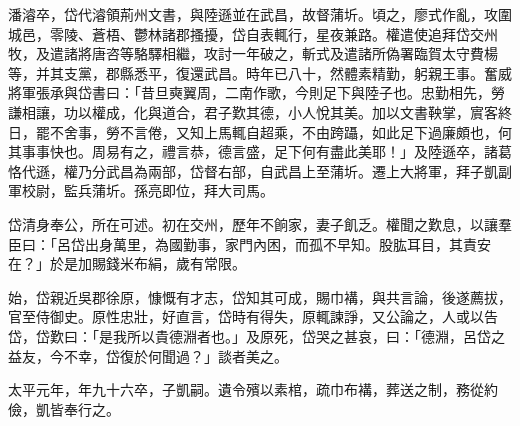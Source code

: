 \begin{pinyinscope}
潘濬卒，岱代濬領荊州文書，與陸遜並在武昌，故督蒲圻。頃之，廖式作亂，攻圍城邑，零陵、蒼梧、鬱林諸郡搔擾，岱自表輒行，星夜兼路。權遣使追拜岱交州牧，及遣諸將唐咨等駱驛相繼，攻討一年破之，斬式及遣諸所偽署臨賀太守費楊等，并其支黨，郡縣悉平，復還武昌。時年已八十，然體素精勤，躬親王事。奮威將軍張承與岱書曰：「昔旦奭翼周，二南作歌，今則足下與陸子也。忠勤相先，勞謙相讓，功以權成，化與道合，君子歎其德，小人悅其美。加以文書鞅掌，賔客終日，罷不舍事，勞不言倦，又知上馬輒自超乘，不由跨躡，如此足下過廉頗也，何其事事快也。周易有之，禮言恭，德言盛，足下何有盡此美耶！」及陸遜卒，諸葛恪代遜，權乃分武昌為兩部，岱督右部，自武昌上至蒲圻。遷上大將軍，拜子凱副軍校尉，監兵蒲圻。孫亮即位，拜大司馬。

岱清身奉公，所在可述。初在交州，歷年不餉家，妻子飢乏。權聞之歎息，以讓羣臣曰：「呂岱出身萬里，為國勤事，家門內困，而孤不早知。股肱耳目，其責安在？」於是加賜錢米布絹，歲有常限。

始，岱親近吳郡徐原，慷慨有才志，岱知其可成，賜巾褠，與共言論，後遂薦拔，官至侍御史。原性忠壯，好直言，岱時有得失，原輒諫諍，又公論之，人或以告岱，岱歎曰：「是我所以貴德淵者也。」及原死，岱哭之甚哀，曰：「德淵，呂岱之益友，今不幸，岱復於何聞過？」談者美之。

太平元年，年九十六卒，子凱嗣。遺令殯以素棺，疏巾布褠，葬送之制，務從約儉，凱皆奉行之。


\end{pinyinscope}